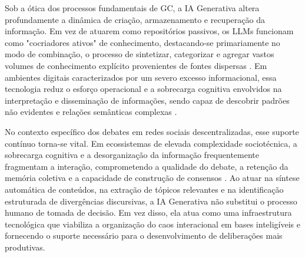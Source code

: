 \documentclass[conference]{IEEEtran} \IEEEoverridecommandlockouts %
\begin{document}
Sob a ótica dos processos fundamentais de GC, a IA Generativa altera profundamente a dinâmica de criação, armazenamento e recuperação da informação. Em vez de atuarem como repositórios passivos, os LLMs funcionam como "cocriadores ativos" de conhecimento, destacando-se primariamente no modo de combinação, o processo de sintetizar, categorizar e agregar vastos volumes de conhecimento explícito provenientes de fontes dispersas \cite{alaviKnowledgeManagementPerspective2024}. Em ambientes digitais caracterizados por um severo excesso informacional, essa tecnologia reduz o esforço operacional e a sobrecarga cognitiva envolvidos na interpretação e disseminação de informações, sendo capaz de descobrir padrões não evidentes e relações semânticas complexas \cite{jarrahiArtificialIntelligenceKnowledge2023,taherdoost2023artificial}.


No contexto específico dos debates em redes sociais descentralizadas, esse suporte contínuo torna-se vital. Em ecossistemas de elevada complexidade sociotécnica, a sobrecarga cognitiva e a desorganização da informação frequentemente fragmentam a interação, comprometendo a qualidade do debate, a retenção da memória coletiva e a capacidade de construção de consensos \cite{taherdoost2023artificial}. Ao atuar na síntese automática de conteúdos, na extração de tópicos relevantes e na identificação estruturada de divergências discursivas, a IA Generativa não substitui o processo humano de tomada de decisão. Em vez disso, ela atua como uma infraestrutura tecnológica que viabiliza a organização do caos interacional em bases inteligíveis e fornecendo o suporte necessário para o desenvolvimento de deliberações mais produtivas.


\end{document}
